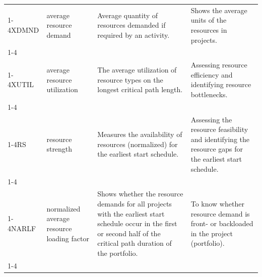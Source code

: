 \documentclass[preprint,
3p]{elsarticle} %
\begin{document}
\begin{appendices}
\begin{longtable}[t]{l>{\raggedright\arraybackslash}p{2.2cm}>{\raggedright\arraybackslash}p{4.1cm}>{\raggedright\arraybackslash}p{3.5cm}}
\endfoot
\bottomrule
\endlastfoot
\cellcolor{gray!10}{NRES} & \cellcolor{gray!10}{number of renewable resources} & \cellcolor{gray!10}{How many resources are available for scheduling activities.} & \cellcolor{gray!10}{Number of renewable resources in the project.}\\
\cmidrule{1-4}\pagebreak[0]
XDMND & average resource demand & Average quantity of resources demanded if required by an activity. & Shows the average units of the resources in projects.\\
\cmidrule{1-4}\pagebreak[0]
\cellcolor{gray!10}{RU} & \cellcolor{gray!10}{resource use} & \cellcolor{gray!10}{Measures for each activity the number of resource types used.} & \cellcolor{gray!10}{How tasks are using resources types. Is a vector of the number of different resources each activity uses.}\\
\cmidrule{1-4}\pagebreak[0]
XUTIL & average resource utilization & The average utilization of resource types on the longest critical path length. & Assessing resource efficiency and identifying resource bottlenecks.\\
\cmidrule{1-4}\pagebreak[0]
\cellcolor{gray!10}{PCTR} & \cellcolor{gray!10}{percentage of activities requiring positive amount of resource type} & \cellcolor{gray!10}{Percentage of activities that require the given resource type} & \cellcolor{gray!10}{How resources are distributed among activities.}\\
\cmidrule{1-4}\pagebreak[0]
RS & resource strength & Measures the availability of resources (normalized) for the earliest start schedule. & Assessing the resource feasibility and identifying the resource gaps for the earliest start schedule.\\
\cmidrule{1-4}\pagebreak[0]
\cellcolor{gray!10}{A\_RS} & \cellcolor{gray!10}{alpha distribution of resource strength} & \cellcolor{gray!10}{Measures the variation (α-distance) of multiple resource strength indicators.} & \cellcolor{gray!10}{Shows the variation of resource strengths in unconnected (sub)prujects.}\\
\cmidrule{1-4}\pagebreak[0]
NARLF & normalized average resource loading factor & Shows whether the resource demands for all projects with the earliest start schedule occur in the first or second half of the critical path duration of the portfolio. & To know whether resource demand is front- or backloaded in the project (portfolio).\\
\cmidrule{1-4}\pagebreak[0]
\cellcolor{gray!10}{GINI} & \cellcolor{gray!10}{Gini coefficient} & \cellcolor{gray!10}{How the total work content (each activity’s renewable resource demand multiplied by its duration) is distributed among all activities.} & \cellcolor{gray!10}{(In)equality of renewable resource profiles among tasks.}\\

\end{longtable}
\end{appendices}
\end{document}
